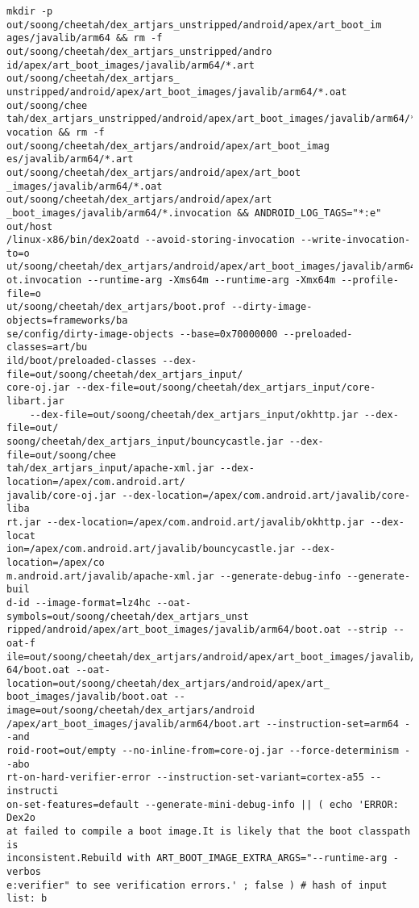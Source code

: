\begin{lstlisting}
mkdir -p out/soong/cheetah/dex_artjars_unstripped/android/apex/art_boot_im
ages/javalib/arm64 && rm -f out/soong/cheetah/dex_artjars_unstripped/andro
id/apex/art_boot_images/javalib/arm64/*.art out/soong/cheetah/dex_artjars_
unstripped/android/apex/art_boot_images/javalib/arm64/*.oat out/soong/chee
tah/dex_artjars_unstripped/android/apex/art_boot_images/javalib/arm64/*.in
vocation && rm -f out/soong/cheetah/dex_artjars/android/apex/art_boot_imag
es/javalib/arm64/*.art out/soong/cheetah/dex_artjars/android/apex/art_boot
_images/javalib/arm64/*.oat out/soong/cheetah/dex_artjars/android/apex/art
_boot_images/javalib/arm64/*.invocation && ANDROID_LOG_TAGS="*:e" out/host
/linux-x86/bin/dex2oatd --avoid-storing-invocation --write-invocation-to=o
ut/soong/cheetah/dex_artjars/android/apex/art_boot_images/javalib/arm64/bo
ot.invocation --runtime-arg -Xms64m --runtime-arg -Xmx64m --profile-file=o
ut/soong/cheetah/dex_artjars/boot.prof --dirty-image-objects=frameworks/ba
se/config/dirty-image-objects --base=0x70000000 --preloaded-classes=art/bu
ild/boot/preloaded-classes --dex-file=out/soong/cheetah/dex_artjars_input/
core-oj.jar --dex-file=out/soong/cheetah/dex_artjars_input/core-libart.jar
    --dex-file=out/soong/cheetah/dex_artjars_input/okhttp.jar --dex-file=out/
soong/cheetah/dex_artjars_input/bouncycastle.jar --dex-file=out/soong/chee
tah/dex_artjars_input/apache-xml.jar --dex-location=/apex/com.android.art/
javalib/core-oj.jar --dex-location=/apex/com.android.art/javalib/core-liba
rt.jar --dex-location=/apex/com.android.art/javalib/okhttp.jar --dex-locat
ion=/apex/com.android.art/javalib/bouncycastle.jar --dex-location=/apex/co
m.android.art/javalib/apache-xml.jar --generate-debug-info --generate-buil
d-id --image-format=lz4hc --oat-symbols=out/soong/cheetah/dex_artjars_unst
ripped/android/apex/art_boot_images/javalib/arm64/boot.oat --strip --oat-f
ile=out/soong/cheetah/dex_artjars/android/apex/art_boot_images/javalib/arm
64/boot.oat --oat-location=out/soong/cheetah/dex_artjars/android/apex/art_
boot_images/javalib/boot.oat --image=out/soong/cheetah/dex_artjars/android
/apex/art_boot_images/javalib/arm64/boot.art --instruction-set=arm64 --and
roid-root=out/empty --no-inline-from=core-oj.jar --force-determinism --abo
rt-on-hard-verifier-error --instruction-set-variant=cortex-a55 --instructi
on-set-features=default --generate-mini-debug-info || ( echo 'ERROR: Dex2o
at failed to compile a boot image.It is likely that the boot classpath is 
inconsistent.Rebuild with ART_BOOT_IMAGE_EXTRA_ARGS="--runtime-arg -verbos
e:verifier" to see verification errors.' ; false ) # hash of input list: b

\end{lstlisting}
